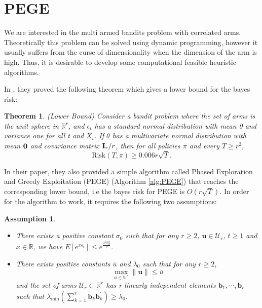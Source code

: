 \documentclass{article}
\newtheorem{theorem}{Theorem}
\theoremstyle{plain}
\newtheorem{assumption}{Assumption}
\theoremstyle{definition}
\begin{document}
\section{PEGE}

We are interested in the multi armed bandits problem with correlated arms. Theoretically this problem can be solved using dynamic programming, however it usually suffers from the curse of dimensionality when the dimension of the arm is high. Thus, it is desirable to develop some computational feasible heuristic algorithms.

In \cite{Paat}, they proved the following theorem which gives a lower bound for the bayes risk:

\begin{theorem}(Lower Bound)
Consider a bandit problem where the set of arms is the unit sphere in $\mathbb{R}^{r}$, and $\epsilon_{t}$ has a standard normal distribution with mean 0 and variance one for all t and $X_{t}$. If $\theta$ has a multivariate normal distribution with mean $\bold{0}$ and covariance matrix $\bold{I}_{r}/r$, then for all policies $\pi$ and every $T\geq r^{2}$,
\begin{equation}
\text{Risk}(T,\pi)\geq 0.006r\sqrt{T}. \nonumber 
\end{equation}
\end{theorem}

In their paper, they also provided a simple algorithm called Phased Exploration and Greedy Exploitation (PEGE) (Algorithm \ref{alg:PEGE}) that reaches the corresponding lower bound, i.e the bayes risk for PEGE is $O(r\sqrt{T})$. In order for the algorithm to work, it requires the following two assumptions:

\begin{assumption}
\begin{itemize}
\item There exists a positive constant $\sigma_{0}$ such that for any $r\geq 2$, $\textbf{u}\in \mathcal{U}_{r}$, $t\geq 1$ and $x\in \mathbb{R}$, we have $E[e^{x \epsilon_{t}}]\leq e^{\frac{x^{2}\sigma_{0}^{2}}{2}}$.
\item There exists positive constants $\bar{u}$ and $\lambda_{0}$ such that for any $r\geq 2$,
\begin{equation}
\max_{u\in \mathbb{U}^{r}}\|\textbf{u}\|\leq \bar{u} \nonumber
\end{equation}
and the set of arms $\mathcal{U}_{r}\subset 
\mathbb{R}^{r}$ has r linearly independent elements $\textbf{b}_{1},\cdots,\textbf{b}_{r}$ such that $\lambda_{\min}(\sum_{k=1}^{r}\textbf{b}_{k}\textbf{b}_{k}^{'})\geq \lambda_{0}$.
\end{itemize}
\end{assumption}
\end{document}
